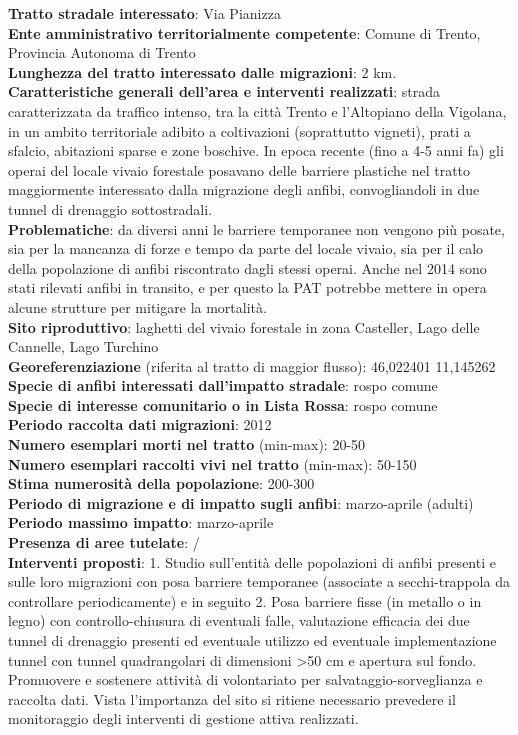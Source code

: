 \documentclass[11pt,a4paper,twoside]{memoir}
\begin{document}
\textbf{Tratto stradale interessato}: Via Pianizza \\
\textbf{Ente amministrativo territorialmente competente}: Comune di Trento, Provincia Autonoma di Trento  \\
\textbf{Lunghezza del tratto interessato dalle migrazioni}: 2 km. \\
\textbf{Caratteristiche generali dell’area e interventi realizzati}: strada caratterizzata da traffico intenso, tra la città Trento e l'Altopiano della Vigolana, in un ambito territoriale adibito a coltivazioni (soprattutto vigneti), prati a sfalcio, abitazioni sparse e zone boschive. In epoca recente (fino a 4-5 anni fa) gli operai del locale vivaio forestale posavano delle barriere plastiche nel tratto maggiormente interessato dalla migrazione degli anfibi, convogliandoli in due tunnel di drenaggio sottostradali. \\
\textbf{Problematiche}: da diversi anni le barriere temporanee non vengono più posate, sia per la mancanza di forze e tempo da parte del locale vivaio, sia per il calo della popolazione di anfibi riscontrato dagli stessi operai. Anche nel 2014 sono stati rilevati anfibi in transito, e per questo la PAT potrebbe mettere in opera alcune strutture per mitigare la mortalità.  \\
\textbf{Sito riproduttivo}: laghetti del vivaio forestale in zona Casteller, Lago delle Cannelle, Lago Turchino \\
\textbf{Georeferenziazione} (riferita al tratto di maggior flusso): 46,022401 11,145262 \\
\textbf{Specie di anfibi interessati dall’impatto stradale}: rospo comune \\
\textbf{Specie di interesse comunitario o in Lista Rossa}: rospo comune \\
\textbf{Periodo raccolta dati migrazioni}: 2012 \\
\textbf{Numero esemplari morti nel tratto} (min-max): 20-50  \\
\textbf{Numero esemplari raccolti vivi nel tratto} (min-max): 50-150 \\
\textbf{Stima numerosità della popolazione}: 200-300 \\
\textbf{Periodo di migrazione e di impatto sugli anfibi}: marzo-aprile (adulti) \\
\textbf{Periodo massimo impatto}: marzo-aprile \\
\textbf{Presenza di aree tutelate}: / \\
\textbf{Interventi proposti}: 1. Studio sull'entità delle popolazioni di anfibi presenti e sulle loro migrazioni con posa barriere temporanee (associate a secchi-trappola da controllare periodicamente) e in seguito 2. Posa barriere fisse (in metallo o in legno) con controllo-chiusura di eventuali falle, valutazione efficacia dei due tunnel di drenaggio presenti ed eventuale utilizzo ed eventuale implementazione tunnel con tunnel quadrangolari di dimensioni >50 cm e apertura sul fondo. Promuovere e sostenere attività di volontariato per salvataggio-sorveglianza e raccolta dati. Vista l’importanza del sito si ritiene necessario prevedere il monitoraggio degli interventi di gestione attiva realizzati. \\
\end{document}
